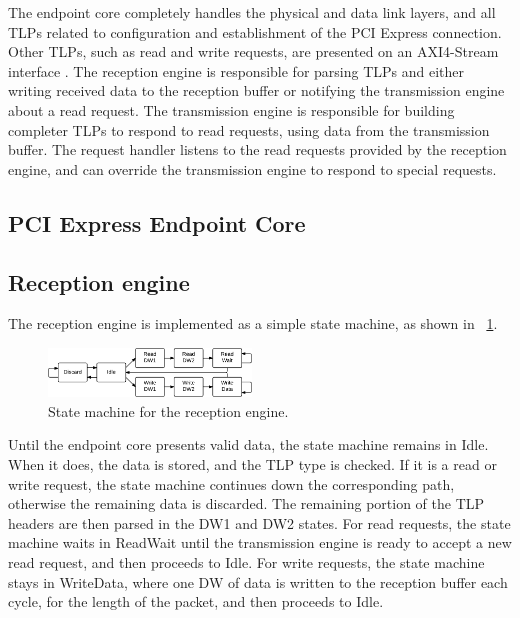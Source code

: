 The endpoint core completely handles the physical and data link layers, and all TLPs related to configuration and establishment of the PCI Express connection.
Other TLPs, such as read and write requests, are presented on an AXI4-Stream interface \cite{ug672}.
The reception engine is responsible for parsing TLPs and either writing received data to the reception buffer or notifying the transmission engine about a read request.
The transmission engine is responsible for building completer TLPs to respond to read requests, using data from the transmission buffer.
The request handler listens to the read requests provided by the reception engine, and can override the transmission engine to respond to special requests.

\subsection{PCI Express Endpoint Core}


\subsection{Reception engine}

The reception engine is implemented as a simple state machine, as shown in \figurename~\ref{fig:statemachine-receive}.

\begin{figure}[!ht]
    \centering
    \includegraphics[width=0.48\textwidth]{figures/statemachine-receive}
    \caption{State machine for the reception engine.}
    \label{fig:statemachine-receive}
\end{figure}

Until the endpoint core presents valid data, the state machine remains in Idle.
When it does, the data is stored, and the TLP type is checked.
If it is a read or write request, the state machine continues down the corresponding path, otherwise the remaining data is discarded.
The remaining portion of the TLP headers are then parsed in the DW1 and DW2 states.
For read requests, the state machine waits in ReadWait until the transmission engine is ready to accept a new read request, and then proceeds to Idle.
For write requests, the state machine stays in WriteData, where one DW of data is written to the reception buffer each cycle, for the length of the packet, and then proceeds to Idle.

